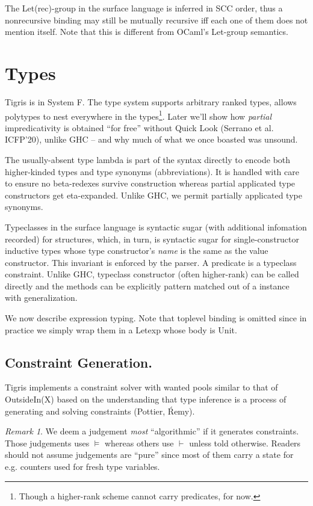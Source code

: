 \documentclass[a4paper, 11pt]{article}
\theoremstyle{remark}
\newtheorem*{remark}{Remark}
\begin{document}
The Let(rec)-group in the surface language is inferred in SCC order, thus a nonrecursive
binding may still be mutually recursive iff each one of them does not mention itself. Note that
this is different from OCaml's Let-group semantics.

\section{Types}
Tigris is in System F. The type system supports arbitrary ranked types,
allows polytypes to nest everywhere in the types\footnote{Though a higher-rank scheme cannot carry predicates, for now.}.
Later we'll show how \emph{partial} impredicativity is obtained ``for free''
without Quick Look (Serrano et al. ICFP'20), unlike GHC -- and why much of what we
once boasted was unsound.

The usually-absent type lambda is part of the syntax directly to encode both higher-kinded
types and type synonyms (abbreviations). It is handled with care to ensure no beta-redexes
survive construction whereas partial applicated type constructors get eta-expanded. Unlike GHC,
we permit partially applicated type synonyms.

Typeclasses in the surface language is syntactic sugar (with additional infomation recorded) for structures,
which, in turn, is syntactic sugar for single-constructor inductive types whose type constructor's \emph{name}
is the same as the value constructor. This invariant is enforced by the parser. A predicate is a typeclass constraint.
Unlike GHC, typeclass constructor (often higher-rank) can be called directly and the methods
can be explicitly pattern matched out of a instance with generalization.

We now describe expression typing. Note that toplevel binding is omitted since in practice
we simply wrap them in a Letexp whose body is \textsf{Unit}.

\subsection{Constraint Generation.} Tigris implements a constraint solver with wanted pools
similar to that of OutsideIn(X) based on the understanding that type
inference is a process of generating and solving constraints (Pottier, \'{R}emy).

\begin{remark}
  We deem a judgement \emph{most} ``algorithmic'' if it generates constraints. Those
  judgements uses $\vDash$ whereas others use $\vdash$ unless told otherwise. Readers
  should not assume judgements are ``pure'' since most of them carry a state for
  e.g. counters used for fresh type variables.
\end{remark}
\end{document}

